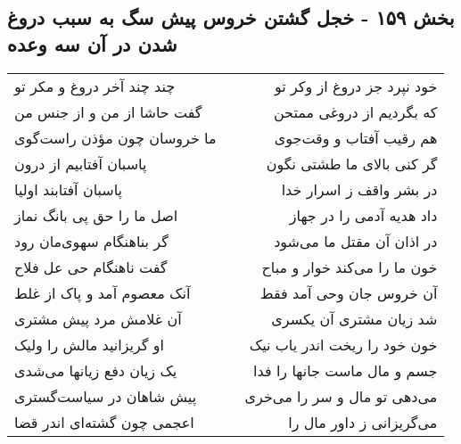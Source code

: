 \begin{center}
\section*{بخش ۱۵۹ - خجل گشتن خروس پیش سگ به سبب دروغ شدن در آن سه وعده}
\label{sec:sh159}
\begin{longtable}{l p{0.5cm} r}
چند چند آخر دروغ و مکر تو
&&
خود نپرد جز دروغ از وکر تو
\\
گفت حاشا از من و از جنس من
&&
که بگردیم از دروغی ممتحن
\\
ما خروسان چون مؤذن راست‌گوی
&&
هم رقیب آفتاب و وقت‌جوی
\\
پاسبان آفتابیم از درون
&&
گر کنی بالای ما طشتی نگون
\\
پاسبان آفتابند اولیا
&&
در بشر واقف ز اسرار خدا
\\
اصل ما را حق پی بانگ نماز
&&
داد هدیه آدمی را در جهاز
\\
گر بناهنگام سهوی‌مان رود
&&
در اذان آن مقتل ما می‌شود
\\
گفت ناهنگام حی عل فلاح
&&
خون ما را می‌کند خوار و مباح
\\
آنک معصوم آمد و پاک از غلط
&&
آن خروس جان وحی آمد فقط
\\
آن غلامش مرد پیش مشتری
&&
شد زیان مشتری آن یکسری
\\
او گریزانید مالش را ولیک
&&
خون خود را ریخت اندر یاب نیک
\\
یک زیان دفع زیانها می‌شدی
&&
جسم و مال ماست جانها را فدا
\\
پیش شاهان در سیاست‌گستری
&&
می‌دهی تو مال و سر را می‌خری
\\
اعجمی چون گشته‌ای اندر قضا
&&
می‌گریزانی ز داور مال را
\\
\end{longtable}
\end{center}
